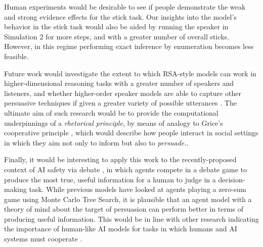 \documentclass[10pt,letterpaper]{article}
\begin{document}
Human experiments would be desirable to see if people demonstrate the weak and strong evidence effects for the stick task.
Our insights into the model's behavior in the stick task would also be aided by running the speaker in Simulation 2 for more steps,
and with a greater number of overall sticks. However, in this regime performing exact inference by enumeration becomes less
feasible.

Future work would investigate the extent to which RSA-style models can work in higher-dimensional reasoning tasks with
a greater number of speakers and listeners,
and whether higher-order speaker models are able to capture other persuasive techniques if given a greater variety of
possible utterances \cite{cialdini1993influence, falk_persuasion_2018}. The ultimate aim of such research would be to
provide the computational underpinnings of a \textit{rhetorical principle}, by means of analogy to Grice's cooperative 
principle \cite{grice_logic_1975}, which would describe how people interact in social settings in which they aim not
only to inform but also to \textit{persuade.}.

Finally, it would be interesting to apply this work to the recently-proposed context of AI safety via debate \cite{irving_ai_2018}, in which
agents compete in a debate game to produce the most true, useful information for a human to judge in a decision-making
task. While previous models have looked at agents playing a zero-sum game using Monte Carlo Tree Search, it is 
plausible that an agent model with a theory of mind about the target of persuasion can perform better in terms of producing
useful information. This would be in line with other research indicating the importance of human-like AI models for tasks in which
humans and AI systems must cooperate \cite{carroll2019utility, hilgard_learning_2019}.


\nocite{lawson-tancred_art_1991}



\setlength{\bibleftmargin}{.125in}
\setlength{\bibindent}{-\bibleftmargin}


\end{document}
